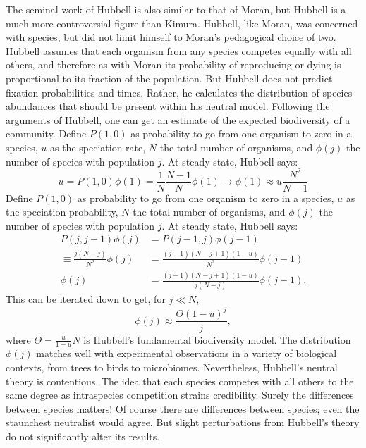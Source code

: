 \documentclass[a4paper,11pt]{article}
\numberwithin{equation}{section} %
\begin{document}
The seminal work of Hubbell \cite{Hubbell2001} is also similar to that of Moran, but Hubbell is a much more controversial figure than Kimura. 
Hubbell, like Moran, was concerned with species, but did not limit himself to Moran's pedagogical choice of two. 
Hubbell assumes that each organism from any species competes equally with all others, and therefore as with Moran its probability of reproducing or dying is proportional to its fraction of the population. 
But Hubbell does not predict fixation probabilities and times. 
Rather, he calculates the distribution of species abundances that should be present within his neutral model. 
Following the arguments of Hubbell, one can get an estimate of the expected biodiversity of a community. 
Define $P(1,0)$ as probability to go from one organism to zero in a species, $u$ as the speciation rate, $N$ the total number of organisms, and $\phi(j)$ the number of species with population $j$. 
At steady state, Hubbell says:
\begin{equation*}
u = P(1,0)\phi(1) = \frac{1}{N}\frac{N-1}{N}\phi(1) \rightarrow \phi(1) \approx u\frac{N^2}{N-1}
\end{equation*}
Define $P(1,0)$ as probability to go from one organism to zero in a species, $u$ as the speciation probability, $N$ the total number of organisms, and $\phi(j)$ the number of species with population $j$. 
At steady state, Hubbell says:
\begin{align*}
                 P(j,j-1)\phi(j) &= P(j-1,j)\phi(j-1) \\
\equiv \frac{j(N-j)}{N^2}\phi(j) &= \frac{(j-1)(N-j+1)(1-u)}{N^2}\phi(j-1) \\
                         \phi(j) &= \frac{(j-1)(N-j+1)(1-u)}{j(N-j)}\phi(j-1).
\end{align*}
This can be iterated down to get, for $j\ll N$,
\begin{equation*}
\phi(j) \approx \frac{\Theta (1-u)^j}{j},
\end{equation*}
where $\Theta = \frac{u}{1-u}N$ is Hubbell's fundamental biodiversity model. 
The distribution $\phi(j)$ matches well with experimental observations in a variety of biological contexts, from trees to birds to microbiomes. 
Nevertheless, Hubbell's neutral theory is contentious. 
The idea that each species competes with all others to the same degree as intraspecies competition strains credibility. 
Surely the differences between species matters! 
Of course there are differences between species; even the staunchest neutralist would agree. 
But slight perturbations from Hubbell's theory do not significantly alter its results. 
\end{document}
